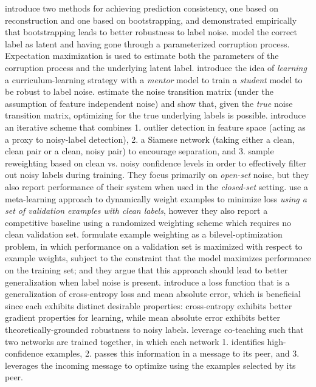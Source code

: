 \documentclass{article}
\renewcommand{\b}[1]{\textbf{#1}}
\begin{document}
\b{\cite{reed2014}} introduce two methods for achieving prediction consistency, one based on reconstruction and one based on bootstrapping, and demonstrated empirically that bootstrapping leads to better robustness to label noise.
\b{\cite{goldberger2016}} model the correct label as latent and having gone through a parameterized corruption process. Expectation maximization is used to estimate both the parameters of the corruption process and the underlying latent label.
\b{\cite{jiang2018}} introduce the idea of \emph{learning} a curriculum-learning strategy with a \emph{mentor} model to train a \emph{student} model to be robust to label noise.
\b{\cite{patrini2016}} estimate the noise transition matrix (under the assumption of feature independent noise) and show that, given the \emph{true} noise transition matrix, optimizing for the true underlying labels is possible.
\b{\cite{wang2018}} introduce an iterative scheme that combines 1. outlier detection in feature space (acting as a proxy to noisy-label detection), 2. a Siamese network (taking either a clean, clean pair or a clean, noisy pair) to encourage separation, and 3. sample reweighting based on clean vs. noisy confidence levels in order to effectively filter out noisy labels during training. They focus primarily on \emph{open-set} noise, but they also report performance of their system when used in the \emph{closed-set} setting.
\b{\cite{ren2018}} use a meta-learning approach to dynamically weight examples to minimize loss \emph{using a set of validation examples with clean labels}, however they also report a competitive baseline using a randomized weighting scheme which requires no clean validation set.
\b{\cite{jenni2018}} formulate example weighting as a bilevel-optimization problem, in which performance on a validation set is maximized with respect to example weights, subject to the constraint that the model maximizes performance on the training set; and they argue that this approach should lead to better generalization when label noise is present. 
\b{\cite{zhang2018}} introduce a loss function that is a generalization of cross-entropy loss and mean absolute error, which is beneficial since each exhibits distinct desirable properties: cross-entropy exhibits better gradient properties for learning, while mean absolute error exhibits better theoretically-grounded robustness to noisy labels. 
\b{\cite{han2018}} leverage co-teaching such that two networks are trained together, in which each network 1. identifies high-confidence examples, 2. passes this information in a message to its peer, and 3. leverages the incoming message to optimize using the examples selected by its peer.
\end{document}
